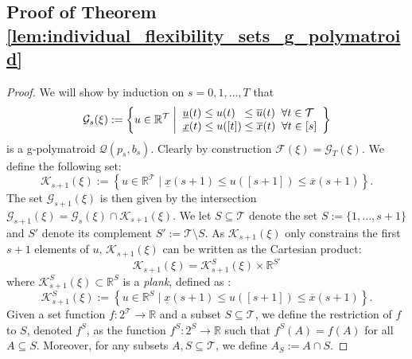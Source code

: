 \subsection{Proof of Theorem \ref{lem:individual_flexibility_sets_g_polymatroid}}
\begin{proof}
We will show by induction on \(s=0,1,\dots,T\) that 
\begin{equation*}
    \mathcal{G}_s(\xi) := \left\{ u \in \mathbb{R}^\mathcal{T} \; \middle\vert \;
    \begin{array}{@{}cl}
        \underline{u}(t) \leq u(t) \;\; \leq \overline{u}(t) \;\; \forall t \in \mathcal{T}\\
        \; \underline{x}(t) \leq u([t]) \leq \overline{x}(t) \;\; \forall t \in [s]
    \end{array} 
    \right\}
\end{equation*}
is a g‐polymatroid \(\mathcal Q(p_s,b_s)\). Clearly by construction $\mathcal{F}(\xi) =  \mathcal{G}_T(\xi)$. 
We define the following set:
\begin{equation*}
    \mathcal{K}_{s+1}(\xi):= \left\{ u\in\mathbb{R}^\mathcal{T} \mid \underline{x}(s+1) \leq u([s+1]) \leq \overline{x}(s+1) \right\}.
\end{equation*}
The set $ \mathcal{G}_{s+1}(\xi)$ is then given by the intersection $\mathcal{G}_{s+1}(\xi) =  \mathcal{G}_s(\xi)  \cap \mathcal{K}_{s+1}(\xi)$.
We let $S \subseteq \mathcal{T}$ denote the set $S:=\{1,...,s+1\}$ and $S'$ denote its complement $S' := \mathcal{T} \setminus S$.
As $\mathcal{K}_{s+1}(\xi)$ only constrains the first $s+1$ elements of $u$, $\mathcal{K}_{s+1}(\xi)$ can be written as the Cartesian product:
\begin{equation}\label{eq:K_s+1_decomposition}
    \mathcal{K}_{s+1}(\xi) = \mathcal{K}^S_{s+1}(\xi) \times \mathbb{R}^{S'}
\end{equation}
where $\mathcal{K}^S_{s+1}(\xi) \subset \mathbb{R}^S$ is a \textit{plank}, defined as \cite[14.1]{Frank2011ConnectionsOptimization}:
\begin{equation*}
    \mathcal{K}^S_{s+1}(\xi) := \left\{ u\in\mathbb{R}^S \mid \underline{x}(s+1) \leq u([s+1]) \leq \overline{x}(s+1) \right\}.
\end{equation*}
Given a set function \( f: 2^{\mathcal{T}} \to \mathbb{R} \) and a subset \( S \subseteq \mathcal{T} \), we define the restriction of \( f \) to \( S \), denoted \( f^S \), as the function \( f^S: 2^{S} \to \mathbb{R} \) such that \( f^S(A) = f(A) \) for all \( A \subseteq S \).  
Moreover, for any subsets \( A, S \subseteq \mathcal{T} \), we define \( A_S := A \cap S \).


\end{proof}
